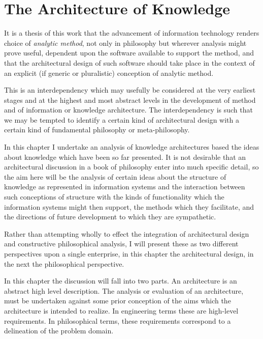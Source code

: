 
\chapter{The Architecture of Knowledge}\label{ArchitectureKnowledge}

It is a thesis of this work that the advancement of information
technology renders choice of \emph{analytic method}, not only in
philosophy but wherever analysis might prove useful, dependent upon
the software available to support the method, and that the
architectural design of such software should take place in the context
of an explicit (if generic or pluralistic) conception of analytic method.

This is an interdependency which may usefully be considered at the
very earliest stages and at the highest and most abstract levels in
the development of method and of information or knowledge architecture.
The interdependency is such that we may be tempted to identify a
certain kind of architectural design with a certain kind of fundamental
philosophy or meta-philosophy.

In this chapter I undertake an analysis of knowledge architectures based
the ideas about knowledge which have been so far presented.
It is not desirable that an architectural discussion in a book of
philosophy enter into much specific detail, so the aim here will be
the analysis of certain ideas about the structure of knowledge as
represented in information systems and the interaction between such
conceptions of structure with the kinds of functionality which the
information systems might then support, the methods which they
facilitate, and the directions of future development to which they are
sympathetic.

Rather than attempting wholly to effect the integration of architectural design
and constructive philosophical analysis,
I will present these as two different perspectives upon a single
enterprise, in this chapter the architectural design, in the next the
philosophical perspective.

In this chapter the discussion will fall into two parts.
An architecture is an abstract high level description.
The analysis or evaluation of an architecture, must be undertaken
against some prior conception of the aims which the architecture is
intended to realize.
In engineering terms these are high-level requirements.
In philosophical terms, these requirements correspond to a delineation
of the problem domain.

